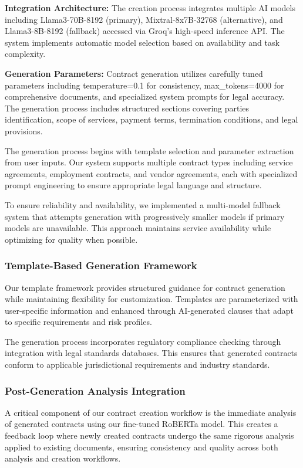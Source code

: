 \textbf{Integration Architecture:} The creation process integrates multiple AI models including Llama3-70B-8192 (primary), Mixtral-8x7B-32768 (alternative), and Llama3-8B-8192 (fallback) accessed via Groq's high-speed inference API. The system implements automatic model selection based on availability and task complexity.

\textbf{Generation Parameters:} Contract generation utilizes carefully tuned parameters including temperature=0.1 for consistency, max\_tokens=4000 for comprehensive documents, and specialized system prompts for legal accuracy. The generation process includes structured sections covering parties identification, scope of services, payment terms, termination conditions, and legal provisions.

The generation process begins with template selection and parameter extraction from user inputs. Our system supports multiple contract types including service agreements, employment contracts, and vendor agreements, each with specialized prompt engineering to ensure appropriate legal language and structure.

To ensure reliability and availability, we implemented a multi-model fallback system that attempts generation with progressively smaller models if primary models are unavailable. This approach maintains service availability while optimizing for quality when possible.

\subsubsection{Template-Based Generation Framework}

Our template framework provides structured guidance for contract generation while maintaining flexibility for customization. Templates are parameterized with user-specific information and enhanced through AI-generated clauses that adapt to specific requirements and risk profiles.

The generation process incorporates regulatory compliance checking through integration with legal standards databases. This ensures that generated contracts conform to applicable jurisdictional requirements and industry standards.

\subsubsection{Post-Generation Analysis Integration}

A critical component of our contract creation workflow is the immediate analysis of generated contracts using our fine-tuned RoBERTa model. This creates a feedback loop where newly created contracts undergo the same rigorous analysis applied to existing documents, ensuring consistency and quality across both analysis and creation workflows.

